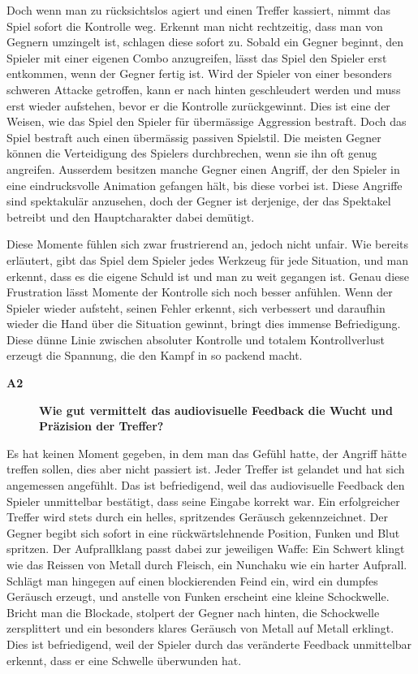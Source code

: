 \documentclass[../Main.tex]{subfiles}
\begin{document}
Doch wenn man zu rücksichtslos agiert und einen Treffer kassiert, nimmt das Spiel sofort die Kontrolle weg. Erkennt man nicht rechtzeitig, dass man von Gegnern umzingelt ist, schlagen diese sofort zu. Sobald ein Gegner beginnt, den Spieler mit einer eigenen Combo anzugreifen, lässt das Spiel den Spieler erst entkommen, wenn der Gegner fertig ist. Wird der Spieler von einer besonders schweren Attacke getroffen, kann er nach hinten geschleudert werden und muss erst wieder aufstehen, bevor er die Kontrolle zurückgewinnt. Dies ist eine der Weisen, wie das Spiel den Spieler für übermässige Aggression bestraft. Doch das Spiel bestraft auch einen übermässig passiven Spielstil. Die meisten Gegner können die Verteidigung des Spielers durchbrechen, wenn sie ihn oft genug angreifen. Ausserdem besitzen manche Gegner einen Angriff, der den Spieler in eine eindrucksvolle Animation gefangen hält, bis diese vorbei ist. Diese Angriffe sind spektakulär anzusehen, doch der Gegner ist derjenige, der das Spektakel betreibt und den Hauptcharakter dabei demütigt.

Diese Momente fühlen sich zwar frustrierend an, jedoch nicht unfair. Wie bereits erläutert, gibt das Spiel dem Spieler jedes Werkzeug für jede Situation, und man erkennt, dass es die eigene Schuld ist und man zu weit gegangen ist. Genau diese Frustration lässt Momente der Kontrolle sich noch besser anfühlen. Wenn der Spieler wieder aufsteht, seinen Fehler erkennt, sich verbessert und daraufhin wieder die Hand über die Situation gewinnt, bringt dies immense Befriedigung. Diese dünne Linie zwischen absoluter Kontrolle und totalem Kontrollverlust erzeugt die Spannung, die den Kampf in  so packend macht.

\begin{description}
    \item[\textbf{A2}] \textbf{Wie gut vermittelt das audiovisuelle Feedback die Wucht und Präzision der Treffer?}
\end{description}

Es hat keinen Moment gegeben, in dem man das Gefühl hatte, der Angriff hätte treffen sollen, dies aber nicht passiert ist. Jeder Treffer ist gelandet und hat sich angemessen angefühlt. Das ist befriedigend, weil das audiovisuelle Feedback den Spieler unmittelbar bestätigt, dass seine Eingabe korrekt war. Ein erfolgreicher Treffer wird stets durch ein helles, spritzendes Geräusch gekennzeichnet. Der Gegner begibt sich sofort in eine rückwärtslehnende Position, Funken und Blut spritzen. Der Aufprallklang passt dabei zur jeweiligen Waffe: Ein Schwert klingt wie das Reissen von Metall durch Fleisch, ein Nunchaku wie ein harter Aufprall. Schlägt man hingegen auf einen blockierenden Feind ein, wird ein dumpfes Geräusch erzeugt, und anstelle von Funken erscheint eine kleine Schockwelle. Bricht man die Blockade, stolpert der Gegner nach hinten, die Schockwelle zersplittert und ein besonders klares Geräusch von Metall auf Metall erklingt. Dies ist befriedigend, weil der Spieler durch das veränderte Feedback unmittelbar erkennt, dass er eine Schwelle überwunden hat.
\end{document}
